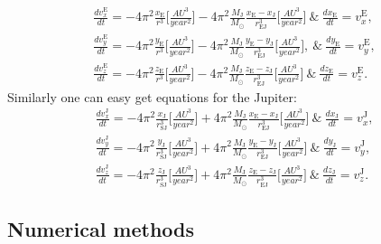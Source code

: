 \documentclass[10pt]{article}
\begin{document}
\begin{equation}\label{eq:motion-3-earth}
\begin{aligned}
\frac{dv_x^{\mathrm{E}}}{dt}=-4\pi^2\frac{x_{\mathrm{E}}}{r^3} \Bigg[ \frac{AU^3}{year^2}\Bigg] - 4\pi^2\frac{M_{\mathrm{J}}}{M_{\odot}}\frac{x_{\mathrm{E}}-x_{\mathrm{J}}}{r_{\mathrm{EJ}}^3} \Bigg[ \frac{AU^3}{year^2}\Bigg]\ \& \ \frac{dx_{\mathrm{E}}}{dt} = v_x^{\mathrm{E}},\\
\frac{dv_y^{\mathrm{E}}}{dt}=-4\pi^2\frac{y_{\mathrm{E}}}{r^3} \Bigg[ \frac{AU^3}{year^2}\Bigg] - 4\pi^2\frac{M_{\mathrm{J}}}{M_{\odot}}\frac{y_{\mathrm{E}}-y_{\mathrm{J}}}{r_{\mathrm{EJ}}^3} \Bigg[ \frac{AU^3}{year^2}\Bigg],\ \& \ \frac{dy_{\mathrm{E}}}{dt} = v_y^{\mathrm{E}},\\
\frac{dv_z^{\mathrm{E}}}{dt}=-4\pi^2\frac{z_{\mathrm{E}}}{r^3} \Bigg[ \frac{AU^3}{year^2}\Bigg] -4\pi^2\frac{M_{\mathrm{J}}}{M_{\odot}}\frac{z_{\mathrm{E}}-z_{\mathrm{J}}}{r_{\mathrm{EJ}}^3} \Bigg[ \frac{AU^3}{year^2}\Bigg]\ \& \ \frac{dz_{\mathrm{E}}}{dt} = v_z^{\mathrm{E}}.
\end{aligned}
\end{equation}  
Similarly one can easy get equations for the Jupiter:
\begin{equation}\label{eq:motion-3-jupiter}
\begin{aligned}
\frac{dv_x^{\mathrm{J}}}{dt}=-4\pi^2\frac{x_{\mathrm{J}}}{r_{\mathrm{SJ}}^3} \Bigg[ \frac{AU^3}{year^2}\Bigg] + 4\pi^2\frac{M_{\mathrm{J}}}{M_{\odot}}\frac{x_{\mathrm{E}}-x_{\mathrm{J}}}{r_{\mathrm{EJ}}^3} \Bigg[ \frac{AU^3}{year^2}\Bigg]\ \& \ \frac{dx_{\mathrm{J}}}{dt} = v_x^{\mathrm{J}},\\
\frac{dv_y^{\mathrm{J}}}{dt}=-4\pi^2\frac{y_{\mathrm{J}}}{r_{\mathrm{SJ}}^3} \Bigg[ \frac{AU^3}{year^2}\Bigg] + 4\pi^2\frac{M_{\mathrm{J}}}{M_{\odot}}\frac{y_{\mathrm{E}}-y_{\mathrm{J}}}{r_{\mathrm{EJ}}^3} \Bigg[ \frac{AU^3}{year^2}\Bigg]\ \& \ \frac{dy_{\mathrm{J}}}{dt} = v_y^{\mathrm{J}}, \\
\frac{dv_z^{\mathrm{J}}}{dt}=-4\pi^2\frac{z_{\mathrm{J}}}{r_{\mathrm{SJ}}^3} \Bigg[ \frac{AU^3}{year^2}\Bigg] + 4\pi^2\frac{M_{\mathrm{J}}}{M_{\odot}}\frac{z_{\mathrm{E}}-z_{\mathrm{J}}}{r_{\mathrm{EJ}}^3} \Bigg[ \frac{AU^3}{year^2}\Bigg]\ \& \ \frac{dz_{\mathrm{J}}}{dt} = v_z^{\mathrm{J}}.
\end{aligned}
\end{equation}  

\subsection{Numerical methods}\label{Numerical methods}
\end{document}
